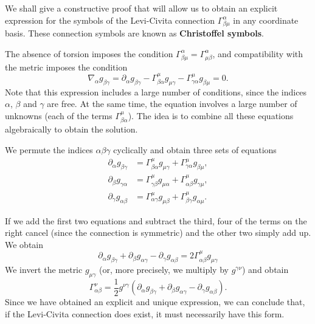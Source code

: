 \begin{points}
\item We shall give a constructive proof that will allow us to obtain an explicit expression for the symbols of the Levi-Civita connection $\Gamma^\alpha_{\beta\mu}$ in any coordinate basis. These connection symbols are known as \textbf{Christoffel symbols}.

\item The absence of torsion imposes the condition $\Gamma^\alpha_{\beta\mu}=\Gamma^\alpha_{\mu\beta}$, and compatibility with the metric imposes the condition
\begin{equation}
  \nabla_\alpha g_{\beta\gamma}=\partial_\alpha g_{\beta\gamma}-\Gamma^\mu_{\beta\alpha}g_{\mu\gamma}-\Gamma^\mu_{\gamma\alpha}g_{\beta\mu}=0 .
\end{equation}
Note that this expression includes a large number of conditions, since the indices $\alpha$, $\beta$ and $\gamma$ are free. At the same time, the equation involves a large number of unknowns (each of the terms $\Gamma^\mu_{\beta\alpha}$). The idea is to combine all these equations algebraically to obtain the solution.

\item We permute the indices $\alpha\beta\gamma$ cyclically and obtain three sets of equations
\begin{align*}
  \partial_\alpha g_{\beta\gamma}&=\Gamma^\mu_{\beta\alpha}g_{\mu\gamma}+\Gamma^\mu_{\gamma\alpha}g_{\beta\mu},\\
  \partial_\beta g_{\gamma\alpha}&=\Gamma^\mu_{\gamma\beta}g_{\mu\alpha}+\Gamma^\mu_{\alpha\beta}g_{\gamma\mu},\\
  \partial_\gamma g_{\alpha\beta}&=\Gamma^\mu_{\alpha\gamma}g_{\mu\beta}+\Gamma^\mu_{\beta\gamma}g_{\alpha\mu}.
\end{align*}

\item If we add the first two equations and subtract the third, four of the terms on the right cancel (since the connection is symmetric) and the other two simply add up. We obtain
\[
  \partial_\alpha g_{\beta\gamma}+\partial_\beta g_{\alpha\gamma}-\partial_\gamma g_{\alpha\beta}=2\Gamma^\mu_{\alpha\beta}g_{\mu\gamma}
\]
We invert the metric $g_{\mu\gamma}$ (or, more precisely, we multiply by $g^{\gamma\nu}$) and obtain
\begin{equation}
  \Gamma^\nu_{\alpha\beta}=\frac12g^{\nu\gamma}\left(\partial_\alpha g_{\beta\gamma}+\partial_\beta g_{\alpha\gamma}-\partial_\gamma g_{\alpha\beta}\right).
\end{equation}
Since we have obtained an explicit and unique expression, we can conclude that, if the Levi-Civita connection does exist, it must necessarily have this form.


\end{points}
